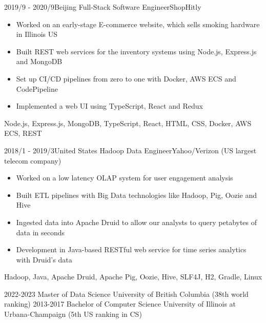 \documentclass[localFont,alternative]{resume_template}
\begin{document}
\begin{experiences}
    \emptySeparator

    \experience
    {2019/9 - 2020/9}{Beijing}
    {Full-Stack Software Engineer}{ShopHitly}
    {
        \begin{itemize}
        \item Worked on an early-stage E-commerce website, which sells smoking hardware in Illinois US
        \item Built REST web services for the inventory systems using Node.js, Express.js and MongoDB
        \item Set up CI/CD pipelines from zero to one with Docker, AWS ECS and CodePipeline
        \item Implemented a web UI using TypeScript, React and Redux
        \end{itemize}
    }
    {Node.js, Express.js, MongoDB, TypeScript, React, HTML, CSS, Docker, AWS ECS, REST}

    \emptySeparator

    \experience
    {2018/1 - 2019/3}{United States}
    {Hadoop Data Engineer}{Yahoo/Verizon (US largest telecom company)}
    {
        \begin{itemize}
        \item Worked on a low latency OLAP system for user engagement analysis
        \item Built ETL pipelines with Big Data technologies like Hadoop, Pig, Oozie and Hive
        \item Ingested data into Apache Druid to allow our analysts to query petabytes of data in seconds
        \item Development in Java-based RESTful web service for time series analytics with Druid's data
        \end{itemize}
    }
    {Hadoop, Java, Apache Druid, Apache Pig, Oozie, Hive, SLF4J, H2, Gradle, Linux}

    \end{experiences}

    \begin{experiences}
    \degree
    {2022-2023}
    {Master of Data Science}
    {University of British Columbia (38th world ranking)}
    \vspace{6pt}
    \degree
    {2013-2017}
    {Bachelor of Computer Science}
    {University of Illinois at Urbana-Champaign (5th US ranking in CS)}
    \end{experiences}
\end{document}
